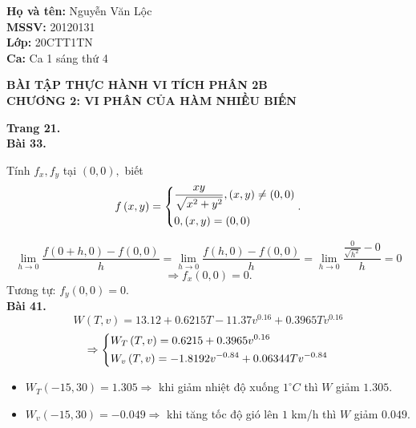 \documentclass[12pt,a4paper]{article}
\author{Nguyễn Văn Lộc}
\begin{document}
\fancyhf{}
\lhead{}
\chead{}
\rhead{}
\cfoot{}
\rfoot{\thepage}
\lfoot{}
\pagestyle{fancy}
\renewcommand{\headrulewidth}{0pt}
\renewcommand{\footrulewidth}{0pt}
\begin{flushleft}
\begin{mybox}
\textbf{Họ và tên:} Nguyễn Văn Lộc\\
\textbf{MSSV:} 20120131\\ 
\textbf{Lớp:} 20CTT1TN\\
\textbf{Ca:} Ca 1 sáng thứ 4
\end{mybox}
\end{flushleft}
\begin{center}
\textbf{BÀI TẬP THỰC HÀNH VI TÍCH PHÂN 2B}\\
\textbf{CHƯƠNG 2: VI PHÂN CỦA HÀM NHIỀU BIẾN}
\end{center}
\textbf{Trang 21.}\\
\textbf{Bài 33.} 
\begin{mybox}
Tính \(f_x, f_y\) tại \(\left( {0, 0} \right),\) biết
\[f\left( {x,y} \right) = \left\{ \begin{gathered}
  \frac{{xy}}{{\sqrt {{x^2} + {y^2}} }},\left( {x,y} \right) \ne \left( {0,0} \right) \hfill \\
  0,\left( {x,y} \right) = \left( {0,0} \right) \hfill \\ 
\end{gathered}  \right..\]
\end{mybox}
\[\mathop {\lim }\limits_{h \to 0} \frac{{f\left( {0 + h,0} \right) - f\left( {0,0} \right)}}{h} = \mathop {\lim }\limits_{h \to 0} \frac{{f\left( {h,0} \right) - f\left( {0,0} \right)}}{h} = \mathop {\lim }\limits_{h \to 0} \frac{{\frac{0}{{\sqrt {{h^2}} }} - 0}}{h} = 0\]
\[ \Rightarrow {f_x}\left( {0,0} \right) = 0.\]
Tương tự: \({f_y}\left( {0,0} \right) = 0.\)\\
\textbf{Bài 41.} \[W\left( {T,v} \right) = 13.12 + 0.6215T - 11.37{v^{0.16}} + 0.3965T{v^{0.16}}\]
\[ \Rightarrow \left\{ \begin{gathered}
  {W_T}\left( {T,v} \right) = 0.6215 + 0.3965{v^{0.16}} \hfill \\
  {W_v}\left( {T,v} \right) =  - 1.8192{v^{ - 0.84}} + 0.06344T{v^{ - 0.84}} \hfill \\ 
\end{gathered}  \right.\]
\begin{itemize}
\item \({W_T}\left( { - 15,30} \right) = 1.305 \Rightarrow \) khi giảm nhiệt độ xuống \(1 ^\circ C\) thì \(W\) giảm \(1.305.\)
\item \({W_v}\left( { - 15,30} \right) =  - 0.049 \Rightarrow \) khi tăng tốc độ gió lên \(1\) km/h thì \(W\) giảm \(0.049.\)
\end{itemize}
\end{document}

